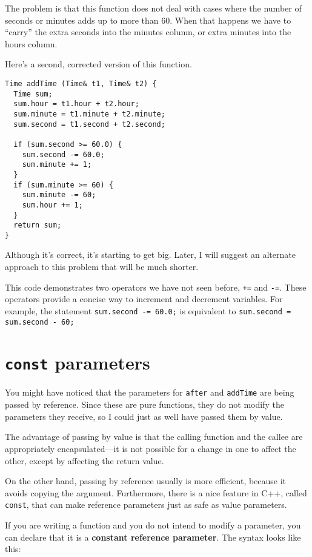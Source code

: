 The problem is that this function does not deal with cases
where the number of seconds or minutes adds up to more than
60.  When that happens we have to ``carry'' the extra seconds
into the minutes column, or extra minutes into the hours
column.

Here's a second, corrected version of this function.

\begin{verbatim}
Time addTime (Time& t1, Time& t2) {
  Time sum;
  sum.hour = t1.hour + t2.hour;
  sum.minute = t1.minute + t2.minute;
  sum.second = t1.second + t2.second;

  if (sum.second >= 60.0) {
    sum.second -= 60.0;
    sum.minute += 1;
  }
  if (sum.minute >= 60) {
    sum.minute -= 60;
    sum.hour += 1;
  }
  return sum;
}
\end{verbatim}
%
Although it's correct, it's starting to get big.  Later,
I will suggest an alternate approach to this problem that
will be much shorter.


This code demonstrates two operators we have not seen before, {\tt +=}
and {\tt -=}.  These operators provide a concise way to increment and
decrement variables.  For example, the statement {\tt sum.second -=
60.0;} is equivalent to {\tt sum.second = sum.second - 60;}

\section{{\tt const} parameters}

You might have noticed that the parameters for {\tt after}
and {\tt addTime} are being passed by reference.  Since
these are pure functions, they do not modify the parameters
they receive, so I could just as well have passed them by
value.

The advantage of passing by value is that the calling function
and the callee are appropriately encapsulated---it is not possible
for a change in one to affect the other, except by affecting
the return value.

On the other hand, passing by reference usually is more efficient,
because it avoids copying the argument.  Furthermore, there is a nice
feature in C++, called {\tt const}, that can make reference parameters
just as safe as value parameters.

If you are writing a function and you do not intend to modify
a parameter, you can declare that it is a {\bf constant
reference parameter}.  The syntax looks like this:

